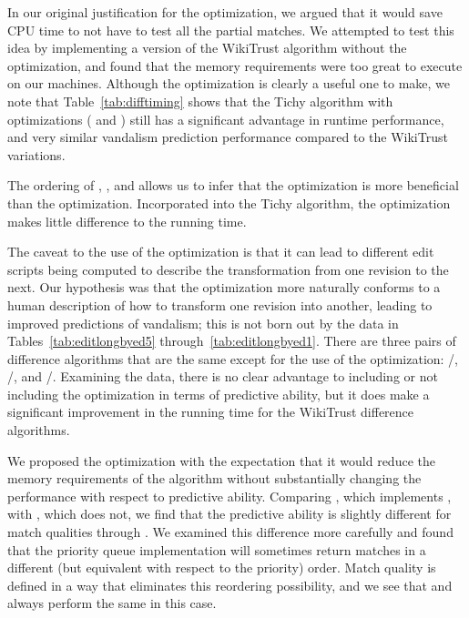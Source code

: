 In our original justification for the 
optimization, we argued that it would save CPU time to not have to test
all the partial matches.
We attempted to test this idea by implementing a version of the
WikiTrust algorithm without the  optimization, and
found that the memory requirements were too great to execute on our machines.
Although the optimization is clearly a useful one to make, we note that
Table~\ref{tab:difftiming} shows that the Tichy algorithm with
optimizations ( and )
still has a significant advantage in runtime performance,
and very similar vandalism prediction performance compared to the
WikiTrust variations.

\vspace{1pc}

The ordering of , , and 
allows us to infer that the  optimization
is more beneficial than the  optimization.
Incorporated into the Tichy algorithm, the
 optimization makes little difference
to the running time.

The caveat to the use of the  optimization
is that it can lead to different edit scripts being computed
to describe the transformation from one revision to the next.
Our hypothesis was that the  optimization
more naturally conforms to a human description of how to transform
one revision into another, leading to improved predictions of
vandalism; this is not born out by the data in
Tables~\ref{tab:editlongbyed5} through~\ref{tab:editlongbyed1}.
There are three pairs of difference algorithms that are the same
except for the use of the  optimization:
/, /,
and /.
Examining the data, there is no clear advantage to including or
not including the  optimization in terms of
predictive ability, but it does make a significant improvement in
the running time for the WikiTrust difference algorithms.

\vspace{1pc}

We proposed the  optimization with the expectation
that it would reduce the memory requirements of the algorithm without
substantially changing the performance with respect to predictive
ability.
Comparing , which implements ,
with , which does not, we find that the predictive ability
is slightly different for match qualities  through
.
We examined this difference more carefully and found that the priority
queue implementation will sometimes return matches in a different
(but equivalent with respect to the priority) order.
Match quality  is defined in a way that eliminates this
reordering possibility, and we see that  and
 always perform the same in this case.

